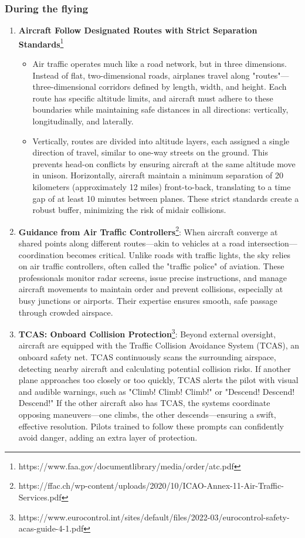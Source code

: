 \documentclass[math,code]{amznotes}
\theoremstyle{remark}
\begin{document}
\subsubsection{During the flying}
\begin{enumerate}
    \item \textbf{Aircraft Follow Designated Routes with Strict Separation Standards}\footnote{https://www.faa.gov/documentlibrary/media/order/atc.pdf}
    \begin{itemize}
        \item Air traffic operates much like a road network, but in three dimensions. Instead of flat, two-dimensional roads, airplanes travel along "routes"—three-dimensional corridors defined by length, width, and height. Each route has specific altitude limits, and aircraft must adhere to these boundaries while maintaining safe distances in all directions: vertically, longitudinally, and laterally.
        \item Vertically, routes are divided into altitude layers, each assigned a single direction of travel, similar to one-way streets on the ground. This prevents head-on conflicts by ensuring aircraft at the same altitude move in unison. Horizontally, aircraft maintain a minimum separation of 20 kilometers (approximately 12 miles) front-to-back, translating to a time gap of at least 10 minutes between planes. These strict standards create a robust buffer, minimizing the risk of midair collisions.
    \end{itemize}
    \item \textbf{Guidance from Air Traffic Controllers}\footnote{https://ffac.ch/wp-content/uploads/2020/10/ICAO-Annex-11-Air-Traffic-Services.pdf}: When aircraft converge at shared points along different routes—akin to vehicles at a road intersection—coordination becomes critical. Unlike roads with traffic lights, the sky relies on air traffic controllers, often called the "traffic police" of aviation. These professionals monitor radar screens, issue precise instructions, and manage aircraft movements to maintain order and prevent collisions, especially at busy junctions or airports. Their expertise ensures smooth, safe passage through crowded airspace.
    \item \textbf{TCAS: Onboard Collision Protection}\footnote{https://www.eurocontrol.int/sites/default/files/2022-03/eurocontrol-safety-acas-guide-4-1.pdf}: Beyond external oversight, aircraft are equipped with the Traffic Collision Avoidance System (TCAS), an onboard safety net. TCAS continuously scans the surrounding airspace, detecting nearby aircraft and calculating potential collision risks. If another plane approaches too closely or too quickly, TCAS alerts the pilot with visual and audible warnings, such as "Climb! Climb! Climb!" or "Descend! Descend! Descend!" If the other aircraft also has TCAS, the systems coordinate opposing maneuvers—one climbs, the other descends—ensuring a swift, effective resolution. Pilots trained to follow these prompts can confidently avoid danger, adding an extra layer of protection.
\end{enumerate}
\end{document}
